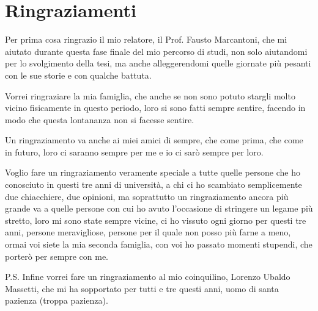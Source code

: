 \chapter*{Ringraziamenti}

Per prima cosa ringrazio il mio relatore, il Prof. Fausto Marcantoni, che mi aiutato durante questa fase finale del mio percorso di studi, non solo aiutandomi per lo svolgimento della tesi, ma anche alleggerendomi quelle giornate più pesanti con le sue storie e con qualche battuta.

Vorrei ringraziare la mia famiglia, che anche se non sono potuto stargli molto vicino fisicamente in questo periodo, loro si sono fatti sempre sentire, facendo in modo che questa lontananza non si facesse sentire.

Un ringraziamento va anche ai miei amici di sempre, che come prima, che come in futuro, loro ci saranno sempre per me e io ci sarò sempre per loro.

Voglio fare un ringraziamento veramente speciale a tutte quelle persone che ho conosciuto in questi tre anni di università, a chi ci ho scambiato semplicemente due chiacchiere, due opinioni, ma soprattutto un ringraziamento ancora più grande va a quelle persone con cui ho avuto l'occasione di stringere un legame più stretto, loro mi sono state sempre vicine, ci ho vissuto ogni giorno per questi tre anni, persone meravigliose, persone per il quale non posso più farne a meno, ormai voi siete la mia seconda famiglia, con voi ho passato momenti stupendi, che porterò per sempre con me.

P.S. Infine vorrei fare un ringraziamento al mio coinquilino, Lorenzo Ubaldo Massetti, che mi ha sopportato per tutti e tre questi anni, uomo di santa pazienza (troppa pazienza).